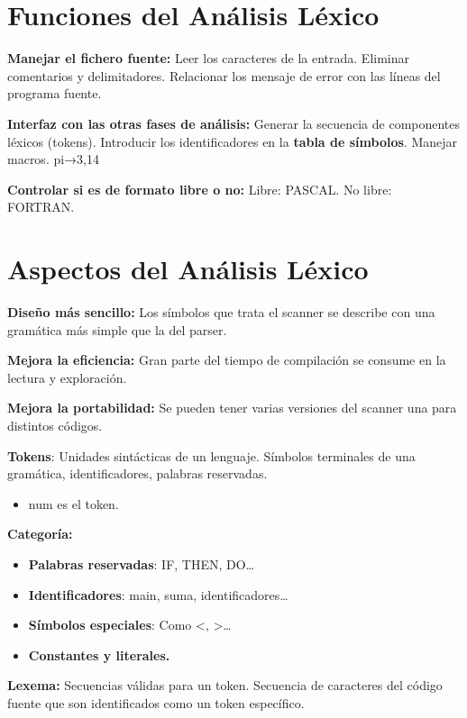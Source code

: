 \documentclass[12pt]{report} %
\begin{document}
\section{Funciones del Análisis Léxico}

\textbf{Manejar el fichero fuente:} Leer los caracteres de la entrada.
Eliminar comentarios y delimitadores. Relacionar los mensaje de error
con las líneas del programa fuente.

\textbf{Interfaz con las otras fases de análisis:} Generar la secuencia
de componentes léxicos (tokens). Introducir los identificadores en la
\textbf{tabla de símbolos}. Manejar macros. pi→3,14

\textbf{Controlar si es de formato libre o no:} Libre: PASCAL. No libre:
FORTRAN.


\section{Aspectos del Análisis Léxico}

\textbf{Diseño más sencillo:} Los símbolos que trata el scanner se
describe con una gramática más simple que la del parser.

\textbf{Mejora la eficiencia:} Gran parte del tiempo de compilación se
consume en la lectura y exploración.

\textbf{Mejora la portabilidad:} Se pueden tener varias versiones del
scanner una para distintos códigos.

\textbf{Tokens}: Unidades sintácticas de un lenguaje. Símbolos
terminales de una gramática, identificadores, palabras reservadas.

\begin{itemize}

\item
  num es el token.
\end{itemize}

\textbf{Categoría:}

\begin{itemize}
\item
  \textbf{Palabras reservadas}: IF, THEN, DO\ldots{}
\item
  \textbf{Identificadores}: main, suma, identificadores\ldots{}
\item
  \textbf{Símbolos especiales}: Como \textless, \textgreater\ldots{}
\item
  \textbf{Constantes y literales.}
\end{itemize}

\textbf{Lexema:} Secuencias válidas para un token. Secuencia de
caracteres del código fuente que son identificados como un token
específico.
\end{document}
